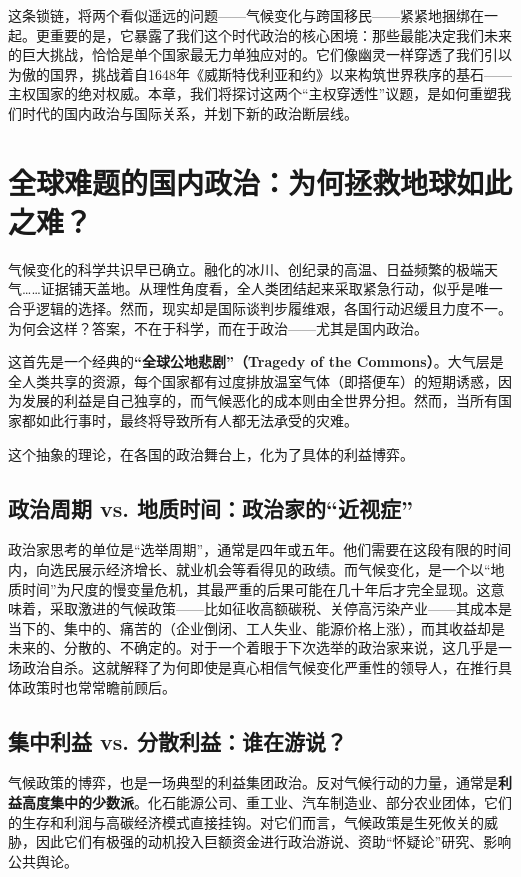 \documentclass[a5paper, 11pt, openany]{ctexbook}
\begin{document}
这条锁链，将两个看似遥远的问题——气候变化与跨国移民——紧紧地捆绑在一起。更重要的是，它暴露了我们这个时代政治的核心困境：那些最能决定我们未来的巨大挑战，恰恰是单个国家最无力单独应对的。它们像幽灵一样穿透了我们引以为傲的国界，挑战着自1648年《威斯特伐利亚和约》以来构筑世界秩序的基石——主权国家的绝对权威。本章，我们将探讨这两个“主权穿透性”议题，是如何重塑我们时代的国内政治与国际关系，并划下新的政治断层线。

\section{全球难题的国内政治：为何拯救地球如此之难？}

气候变化的科学共识早已确立。融化的冰川、创纪录的高温、日益频繁的极端天气……证据铺天盖地。从理性角度看，全人类团结起来采取紧急行动，似乎是唯一合乎逻辑的选择。然而，现实却是国际谈判步履维艰，各国行动迟缓且力度不一。为何会这样？答案，不在于科学，而在于政治——尤其是国内政治。

这首先是一个经典的\textbf{“全球公地悲剧”（Tragedy of the Commons）}。大气层是全人类共享的资源，每个国家都有过度排放温室气体（即搭便车）的短期诱惑，因为发展的利益是自己独享的，而气候恶化的成本则由全世界分担。然而，当所有国家都如此行事时，最终将导致所有人都无法承受的灾难。

这个抽象的理论，在各国的政治舞台上，化为了具体的利益博弈。

\subsection{政治周期 vs. 地质时间：政治家的“近视症”}

政治家思考的单位是“选举周期”，通常是四年或五年。他们需要在这段有限的时间内，向选民展示经济增长、就业机会等看得见的政绩。而气候变化，是一个以“地质时间”为尺度的慢变量危机，其最严重的后果可能在几十年后才完全显现。这意味着，采取激进的气候政策——比如征收高额碳税、关停高污染产业——其成本是当下的、集中的、痛苦的（企业倒闭、工人失业、能源价格上涨），而其收益却是未来的、分散的、不确定的。对于一个着眼于下次选举的政治家来说，这几乎是一场政治自杀。这就解释了为何即使是真心相信气候变化严重性的领导人，在推行具体政策时也常常瞻前顾后。

\subsection{集中利益 vs. 分散利益：谁在游说？}

气候政策的博弈，也是一场典型的利益集团政治。反对气候行动的力量，通常是\textbf{利益高度集中的少数派}。化石能源公司、重工业、汽车制造业、部分农业团体，它们的生存和利润与高碳经济模式直接挂钩。对它们而言，气候政策是生死攸关的威胁，因此它们有极强的动机投入巨额资金进行政治游说、资助“怀疑论”研究、影响公共舆论。
\end{document}

